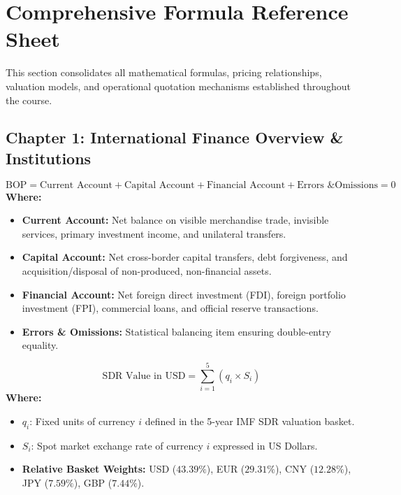 \newpage
\chapter*{Comprehensive Formula Reference Sheet}

This section consolidates all mathematical formulas, pricing relationships, valuation models, and operational quotation mechanisms established throughout the course.

\section*{Chapter 1: International Finance Overview \& Institutions}

\begin{formulabox}
\begin{equation*}
    \text{BOP} = \text{Current Account} + \text{Capital Account} + \text{Financial Account} + \text{Errors \& Omissions} = 0
\end{equation*}
\textbf{Where:}
\begin{itemize}[leftmargin=*, noitemsep]
    \item \textbf{Current Account:} Net balance on visible merchandise trade, invisible services, primary investment income, and unilateral transfers.
    \item \textbf{Capital Account:} Net cross-border capital transfers, debt forgiveness, and acquisition/disposal of non-produced, non-financial assets.
    \item \textbf{Financial Account:} Net foreign direct investment (FDI), foreign portfolio investment (FPI), commercial loans, and official reserve transactions.
    \item \textbf{Errors \& Omissions:} Statistical balancing item ensuring double-entry equality.
\end{itemize}
\end{formulabox}

\begin{formulabox}
\begin{equation*}
    \text{SDR Value in USD} = \sum_{i=1}^{5} \left( q_i \times S_i \right)
\end{equation*}
\textbf{Where:}
\begin{itemize}[leftmargin=*, noitemsep]
    \item $q_i$: Fixed units of currency $i$ defined in the 5-year IMF SDR valuation basket.
    \item $S_i$: Spot market exchange rate of currency $i$ expressed in US Dollars.
    \item \textbf{Relative Basket Weights:} USD ($43.39\%$), EUR ($29.31\%$), CNY ($12.28\%$), JPY ($7.59\%$), GBP ($7.44\%$).
\end{itemize}
\end{formulabox}

